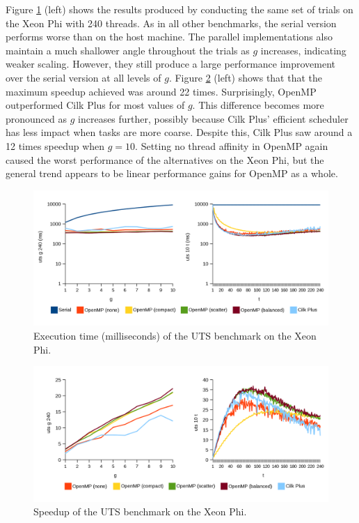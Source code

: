 \documentclass{report}
\begin{document}
Figure \ref{Fig:utsmictime} (left) shows the results produced by conducting the same set of trials on the Xeon Phi with 240 threads. As in all other benchmarks, the serial version performs worse than on the host machine. The parallel implementations also maintain a much shallower angle throughout the trials as \(g\) increases, indicating weaker scaling. However, they still produce a large performance improvement over the serial version at all levels of \(g\). Figure \ref{Fig:utsmicspeedup} (left) shows that that the maximum speedup achieved was around 22 times. Surprisingly, OpenMP outperformed Cilk Plus for most values of \(g\). This difference becomes more pronounced as \(g\) increases further, possibly because Cilk Plus' efficient scheduler has less impact when tasks are more coarse. Despite this, Cilk Plus saw around a 12 times speedup when \(g=10\). Setting no thread affinity in OpenMP again caused the worst performance of the alternatives on the Xeon Phi, but the general trend appears to be linear performance gains for OpenMP as a whole.
\noindent
\begin{figure}[t!]
	\includegraphics[width=\linewidth]{../../charts/mic/uts_time}
	\caption{Execution time (milliseconds) of the UTS benchmark on the Xeon Phi.}
	\label{Fig:utsmictime}
\end{figure}
\noindent
\begin{figure}[t!]
	\includegraphics[width=\linewidth]{../../charts/mic/uts_speedup}
	\caption{Speedup of the UTS benchmark on the Xeon Phi.}
	\label{Fig:utsmicspeedup}
\end{figure}
\end{document}
